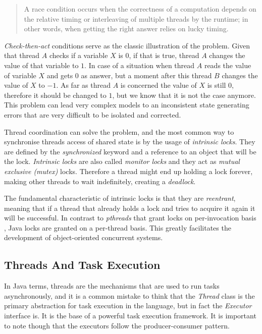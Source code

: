 \begin{quote}
   A race condition occurs when the correctness of a computation depends on the relative timing or interleaving of multiple threads by the runtime; in other words, when getting the right answer relies on lucky timing.
\end{quote}

\emph{Check-then-act} conditions serve as the classic illustration of the problem. Given that thread $A$ checks if a variable $X$ is $0$, if that is true, thread $A$ changes the value of that variable to $1$. In case of a situation when thread $A$ reads the value of variable $X$ and gets $0$ as answer, but a moment after this thread $B$ changes the value of $X$ to $-1$. As far as thread $A$ is concerned the value of $X$ is still $0$, therefore it should be changed to $1$, but we know that it is not the case anymore. This problem can lead very complex models to an inconsistent state generating errors that are very difficult to be isolated and corrected. 

Thread coordination can solve the problem, and the most common way to synchronise threads access of shared state is by the usage of \emph{intrinsic locks}. They are defined by the \emph{synchronized} keyword and a reference to an object that will be the lock. \emph{Intrinsic locks} are also called \emph{monitor locks} and they act as \emph{mutual exclusive (mutex)} locks. Therefore a thread might end up holding a lock forever, making other threads to wait indefinitely, creating a \emph{deadlock}. 

The fundamental characteristic of intrinsic locks is that they are \emph{reentrant}, meaning that if a thread that already holds a lock and tries to acquire it again it will be successful. In contrast to \emph{pthreads} that grant locks on per-invocation basis \cite{butenhof1997programming}, Java locks are granted on a per-thread basis. This greatly facilitates the development of object-oriented concurrent systems. \cite{goetz2006java}

\subsection{Threads And Task Execution}
\label{subsec:threads-task-exec}

In Java terms, threads are the mechanisms that are used to run tasks asynchronously, and it is a common mistake to think that the \emph{Thread} class is the primary abstraction for task execution in the language, but in fact the \emph{Executor} interface is. It is the base of a powerful task execution framework. It is important to note though that the executors follow the producer-consumer pattern.

